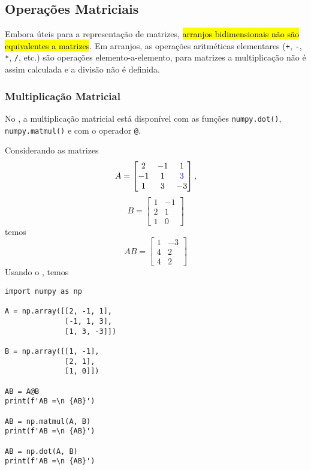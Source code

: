 \subsection{Operações Matriciais}

Embora úteis para a representação de matrizes, \hl{arranjos bidimensionais não são equivalentes a matrizes}. Em arranjos, as operações aritméticas elementares (\lstinline!+!, \lstinline!-!, \lstinline!*!, \lstinline!/!, etc.) são operações elemento-a-elemento, para matrizes a multiplicação não é assim calculada e a divisão não é definida.

\subsubsection{Multiplicação Matricial}

No {\numpy}, a multiplicação matricial está disponível com as funções \lstinline+numpy.dot()+, \lstinline+numpy.matmul()+ e com o operador \lstinline+@+.

\begin{ex}
  Considerando as matrizes
  \begin{equation}
    A =
    \begin{bmatrix}
      2 & -1 & 1\\
      -1 & 1 & {\color{blue}3}\\
      1 & 3 & -3
    \end{bmatrix},
  \end{equation}
  \begin{equation}
    B =
    \begin{bmatrix}
      1 & -1\\
      2 & 1\\
      1 & 0
    \end{bmatrix}
  \end{equation}
  temos
  \begin{equation}
    AB =
    \begin{bmatrix}
      1 & -3\\
      4 & 2\\
      4 & 2
    \end{bmatrix}
  \end{equation}
  Usando o {\numpy}, temos

\begin{lstlisting}
import numpy as np

A = np.array([[2, -1, 1],
              [-1, 1, 3],
              [1, 3, -3]])

B = np.array([[1, -1],
              [2, 1],
              [1, 0]])

AB = A@B
print(f'AB =\n {AB}')

AB = np.matmul(A, B)
print(f'AB =\n {AB}')

AB = np.dot(A, B)
print(f'AB =\n {AB}')
\end{lstlisting}

\end{ex}

